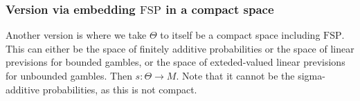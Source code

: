 \documentclass[11pt]{article}
\theoremstyle{definition}
\theoremstyle{remark}
\newcommand{\FSP}{\mathrm{FSP}}
\begin{document}
\subsubsection{Version via embedding $\FSP$ in a compact space}

Another version is where we take $\Theta$ to itself be a compact space including $\FSP$. This can either be the space of finitely additive probabilities or the space of linear previsions for bounded gambles, or the space of exteded-valued linear previsions for unbounded gambles. Then $s:\Theta\to M$. Note that it cannot be the sigma-additive probabilities, as this is not compact. 


\begin{center}
\end{center}
\end{document}
